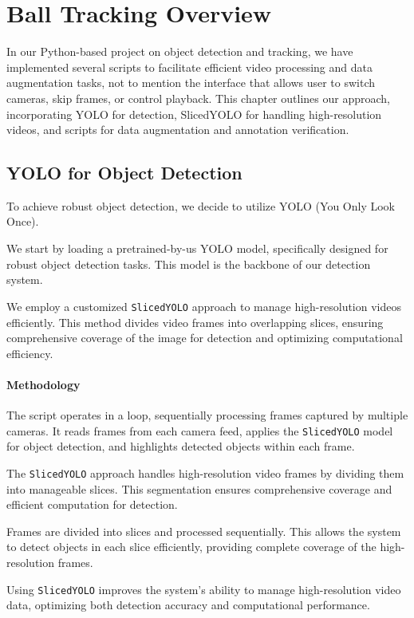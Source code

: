 \documentclass{template}
\begin{document}
\chapter{Ball Tracking Overview}

In our Python-based project on object detection and tracking, we have implemented several scripts to facilitate efficient video processing and data augmentation tasks, not to mention the interface that allows user to switch cameras, skip frames, or control playback.
This chapter outlines our approach, incorporating YOLO for detection, SlicedYOLO for handling high-resolution videos, and scripts for data augmentation and annotation verification.

\section{YOLO for Object Detection}
To achieve robust object detection, we decide to utilize YOLO (You Only Look
Once).

We start by loading a pretrained-by-us YOLO model, specifically designed for robust object detection tasks. This model is the backbone of our detection system.

We employ a customized \texttt{SlicedYOLO} approach to manage high-resolution videos efficiently. This method divides video frames into overlapping slices, ensuring comprehensive coverage of the image for detection and optimizing computational efficiency.

\subsubsection{Methodology}
The script operates in a loop, sequentially processing frames captured by multiple cameras. It reads frames from each camera feed, applies the \texttt{SlicedYOLO} model for object detection, and highlights detected objects within each frame. 

The \texttt{SlicedYOLO} approach handles high-resolution video frames by dividing them into manageable slices. This segmentation ensures comprehensive coverage and efficient computation for detection.

Frames are divided into slices and processed sequentially. This allows the system to detect objects in each slice efficiently, providing complete coverage of the high-resolution frames.

Using \texttt{SlicedYOLO} improves the system's ability to manage high-resolution video data, optimizing both detection accuracy and computational performance.
\end{document}
